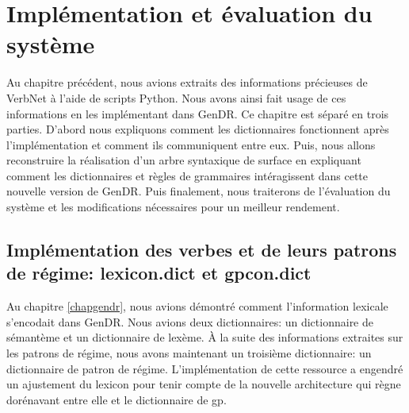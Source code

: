 
\chapter{Implémentation et évaluation du système}\label{eval}

Au chapitre précédent, nous avions extraits des informations précieuses de VerbNet à l'aide de scripts Python. Nous avons ainsi fait usage de ces informations en les implémentant dans GenDR. Ce chapitre est séparé en trois parties. D'abord nous expliquons comment les dictionnaires fonctionnent après l'implémentation et comment ils communiquent entre eux. Puis, nous allons reconstruire la réalisation d'un arbre syntaxique de surface en expliquant comment les dictionnaires et règles de grammaires intéragissent dans cette nouvelle version de GenDR. Puis finalement, nous traiterons de l'évaluation du système et les modifications nécessaires pour un meilleur rendement.

\section{Implémentation des verbes et de leurs patrons de régime: lexicon.dict et gpcon.dict}

Au chapitre \ref{chapgendr}, nous avions démontré comment l'information lexicale s'encodait dans GenDR. Nous avions deux dictionnaires: un dictionnaire de sémantème et un dictionnaire de lexème. À la suite des informations extraites sur les patrons de régime, nous avons maintenant un troisième dictionnaire: un dictionnaire de patron de régime. L'implémentation de cette ressource a engendré un ajustement du lexicon pour tenir compte de la nouvelle architecture qui règne dorénavant entre elle et le dictionnaire de gp.

